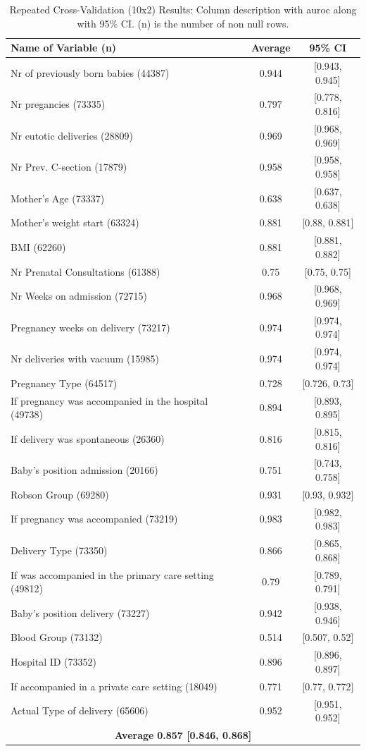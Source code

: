 \begin{table}[h!]
    \caption{Repeated Cross-Validation (10x2) Results: Column description with \ac{auroc} along with 95\% CI. (n) is the number of non null rows.} \label{tab:result_auc} 
   
   \renewcommand{\arraystretch}{1.2}
   \centering
   \begin{tabular} {lcc }
    \toprule
    Name of Variable (n) &               Average &               95\% CI \\
 \midrule
   Nr of previously born babies (44387) & 0.944 & [0.943, 0.945] \\
   Nr pregancies (73335) & 0.797 & [0.778, 0.816] \\
   Nr eutotic deliveries (28809) & 0.969 & [0.968, 0.969] \\
   Nr Prev. C-section (17879)& 0.958 & [0.958, 0.958] \\
   Mother’s Age (73337) & 0.638 & [0.637, 0.638] \\
   Mother’s weight start (63324)& 0.881 & [0.88, 0.881] \\
   BMI (62260) & 0.881 & [0.881, 0.882] \\
   Nr Prenatal Consultations (61388) & 0.75 & [0.75, 0.75] \\
   Nr Weeks on admission (72715) & 0.968 & [0.968, 0.969] \\
   Pregnancy weeks on delivery (73217) & 0.974 & [0.974, 0.974] \\
   Nr deliveries with vacuum (15985) & 0.974 & [0.974, 0.974] \\
   Pregnancy Type (64517) & 0.728 & [0.726, 0.73]\\
   If pregnancy was accompanied in the hospital (49738)& 0.894 & [0.893, 0.895] \\
    If delivery was spontaneous (26360) & 0.816 & [0.815, 0.816] \\
    Baby’s position admission (20166)& 0.751 & [0.743, 0.758] \\
    Robson Group (69280) & 0.931 & [0.93, 0.932] \\
    If pregnancy was accompanied (73219) & 0.983 & [0.982, 0.983] \\
    Delivery Type (73350)& 0.866 & [0.865, 0.868] \\
    If was accompanied in the primary care setting (49812) & 0.79 & [0.789, 0.791] \\
    Baby’s position delivery (73227) & 0.942 & [0.938, 0.946] \\
    Blood Group (73132) & 0.514 & [0.507, 0.52] \\
    Hospital ID (73352) & 0.896 & [0.896, 0.897] \\
    If accompanied in a private care setting (18049) & 0.771 & [0.77, 0.772] \\
    Actual Type of delivery (65606) & 0.952 & [0.951, 0.952] \\
   \hline
    \multicolumn{3}{c}{\textbf{Average}  \textbf{0.857 [0.846, 0.868]}} \\
   
   \hline
   \end{tabular}
   \end{table}

